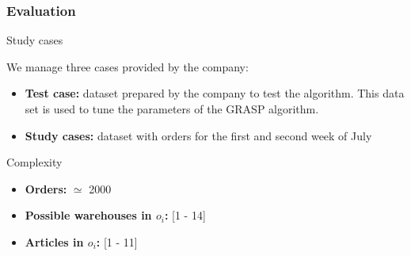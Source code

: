 \documentclass[t,compress,11pt,xcolor=dvipsnames,pdf,english]{beamer}
\begin{document}
\begin{frame}[c]{ }
    \frametitle{Evaluation}
    \begin{block}{Study cases}
        {
            We manage three cases provided by the company:
            \begin{itemize}
                \item \textbf{Test case:} dataset prepared by the company to test the algorithm. This data set is used to tune the parameters of the GRASP algorithm.
                \item \textbf{Study cases:} dataset with orders for the first and second week of July  
            \end{itemize}
        }
    \end{block}
    \begin{block}{Complexity}
        {
            \begin{itemize}
                \item \textbf{Orders:} $\simeq$ 2000
                \item \textbf{Possible warehouses in $o_i$:} [1 - 14]
                \item \textbf{Articles in $o_i$:} [1 - 11]
            \end{itemize}
        }
    \end{block}
    \end{frame}

\end{document}
